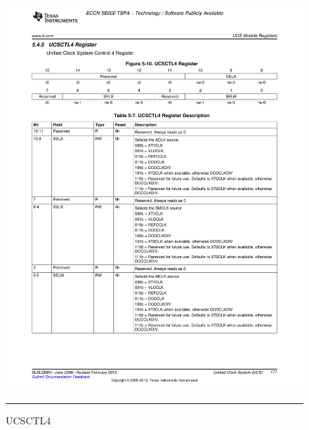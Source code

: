 \pagebreak
\begin{figure}[H]
  \centering
  \includegraphics [angle=0, width=16cm]{./Figures/Chap6_Horloges/UCSCTL4.pdf}
  \rule{35em}{0.5pt}
  \caption{UCSCTL4}
  \label{fig:UCSCTL4}
\end{figure}

